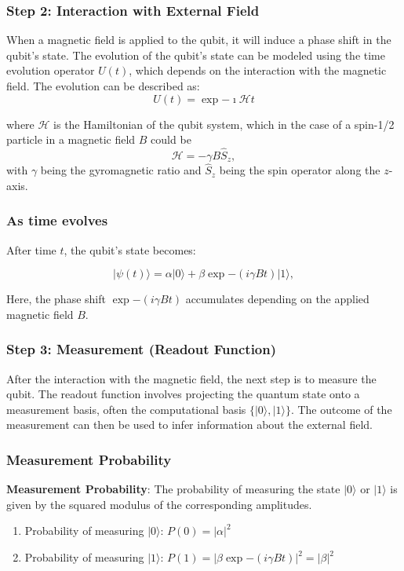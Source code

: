 \documentclass{beamer}
\begin{document}
\begin{frame}
\frametitle{Step 2: Interaction with External Field}

When a magnetic field is applied to the qubit, it will induce a phase
shift in the qubit’s state. The evolution of the qubit’s state can be
modeled using the time evolution operator $U(t)$, which depends on the
interaction with the magnetic field. The evolution can be described
as:
\[
U(t) = \exp{-\imath  \mathcal{H} t}
\]

where $\mathcal{H}$ is the Hamiltonian of the qubit system, which in
the case of a spin-1/2 particle in a magnetic field $B$ could be
\[
\mathcal{H} =-\gamma B \hat{S}_z,
\]
with $\gamma$ being the gyromagnetic ratio and
$\hat{S}_z$ being the spin operator along the $z$-axis.
\end{frame}

\begin{frame}
\frametitle{As time evolves}

After time $t$, the qubit’s state becomes:

\[
\vert \psi(t) \rangle = \alpha \vert 0\rangle + \beta \exp{-(i \gamma B t)} \vert 1\rangle,
\]

Here, the phase shift $\exp{-(i \gamma B t)}$ accumulates depending on the applied magnetic field $B$.
\end{frame}

\begin{frame}
\frametitle{Step 3: Measurement (Readout Function)}

After the interaction with the magnetic field, the next step is to
measure the qubit. The readout function involves projecting the
quantum state onto a measurement basis, often the computational basis
$\{|0\rangle, |1\rangle\}$. The outcome of the measurement can then be
used to infer information about the external field.
\end{frame}

\begin{frame}
\frametitle{Measurement Probability}

\textbf{Measurement Probability}: The probability of measuring the state
$\vert 0\rangle$  or $\vert 1\rangle$ is given by the squared modulus of the
corresponding amplitudes.

\begin{enumerate}
\item Probability of measuring $\vert 0\rangle$: $P(0) = |\alpha|^2$

\item Probability of measuring $\vert 1\rangle$: $P(1) = |\beta \exp{-(i \gamma B t)}|^2 = |\beta|^2$
\end{enumerate}

\noindent
\end{frame}
\end{document}
